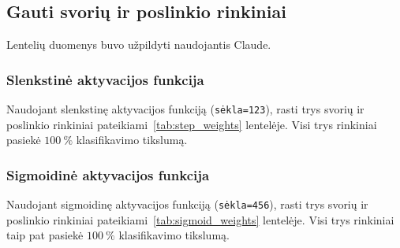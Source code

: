 \subsection{Gauti svorių ir poslinkio rinkiniai}
\label{subsec:rezultatai}

Lentelių duomenys buvo užpildyti naudojantis Claude\cite{claude_bendrai}.

\subsubsection{Slenkstinė aktyvacijos funkcija}

Naudojant slenkstinę aktyvacijos funkciją (\texttt{sėkla=123}), rasti trys svorių ir poslinkio rinkiniai pateikiami~\ref{tab:step_weights} lentelėje. Visi trys rinkiniai pasiekė $100\ \%$ klasifikavimo tikslumą.



\subsubsection{Sigmoidinė aktyvacijos funkcija}

Naudojant sigmoidinę aktyvacijos funkciją (\texttt{sėkla=456}), rasti trys svorių ir poslinkio rinkiniai pateikiami~\ref{tab:sigmoid_weights} lentelėje. Visi trys rinkiniai taip pat pasiekė $100\ \%$ klasifikavimo tikslumą.

